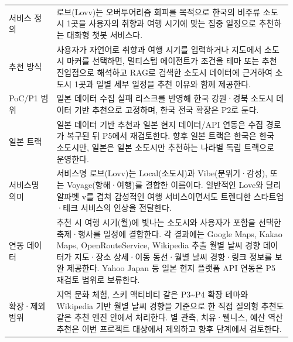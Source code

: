 \documentclass[12pt,a4paper]{article}
\renewcommand{\arraystretch}{1.35}
\begin{document}
\begin{small}
\setlength{\tabcolsep}{3pt}
\setlength{\extrarowheight}{1pt}
\renewcommand{\arraystretch}{1.46}
\begin{longtable}{@{}>{\centering\arraybackslash}m{0.168\linewidth}>{\RaggedRight\arraybackslash}m{0.792\linewidth}@{}}
\toprule
\multicolumn{1}{>{\centering\arraybackslash}m{0.168\linewidth}}{\textbf{구분}} & \multicolumn{1}{>{\centering\arraybackslash}m{0.792\linewidth}}{\textbf{핵심 내용}} \\
\midrule
\endhead
서비스 정의 & 로브(Lovv)는 오버투어리즘 회피를 목적으로 한국의 비주류 소도시 1곳을 사용자의 취향과 여행 시기에 맞는 집중 일정으로 추천하는 대화형 챗봇 서비스다. \\
추천 방식 & 사용자가 자연어로 취향과 여행 시기를 입력하거나 지도에서 소도시 마커를 선택하면, 멀티스텝 에이전트가 조건을 테마 또는 추천 진입점으로 해석하고 RAG로 검색한 소도시 데이터에 근거하여 소도시 1곳과 일별 세부 일정을 추천 이유와 함께 제공한다. \\
PoC/P1 범위 & 일본 데이터 수집 실패 리스크를 반영해 한국 강원·경북 소도시 데이터 기반 추천으로 고정하며, 한국 전국 확장은 P2로 둔다. \\
일본 트랙 & 일본 데이터 기반 추천과 일본 현지 데이터/API 연동은 수집 경로가 복구된 뒤 P5에서 재검토한다. 향후 일본 트랙은 한국은 한국 소도시만, 일본은 일본 소도시만 추천하는 나라별 독립 트랙으로 운영한다. \\
서비스명 의미 & 서비스명 로브(Lovv)는 Local(소도시)과 Vibe(분위기·감성), 또는 Voyage(항해·여행)를 결합한 이름이다. 일반적인 Love와 달리 알파벳 v를 겹쳐 감성적인 여행 서비스이면서도 트렌디한 스타트업·테크 서비스의 인상을 전달한다. \\
연동 데이터 & 추천 시 여행 시기(월)에 빛나는 소도시와 사용자가 포함을 선택한 축제·행사를 일정에 결합한다. 각 결과에는 Google Maps, Kakao Maps, OpenRouteService, Wikipedia 추출 월별 날씨 경향 데이터가 지도·장소 상세·이동 동선·월별 날씨 경향·링크 정보를 보완 제공한다. Yahoo Japan 등 일본 현지 플랫폼 API 연동은 P5 재검토 범위로 보류한다. \\
확장·제외 범위 & 지역 문화 체험, 스키 액티비티 같은 P3\textasciitilde{}P4 확장 테마와 Wikipedia 기반 월별 날씨 경향을 기준으로 한 직접 질의형 추천도 같은 추천 엔진 안에서 처리한다. 별 관측, 치유·웰니스, 예산 역산 추천은 이번 프로젝트 대상에서 제외하고 향후 단계에서 검토한다. \\
\bottomrule
\end{longtable}
\end{small}
\end{document}
